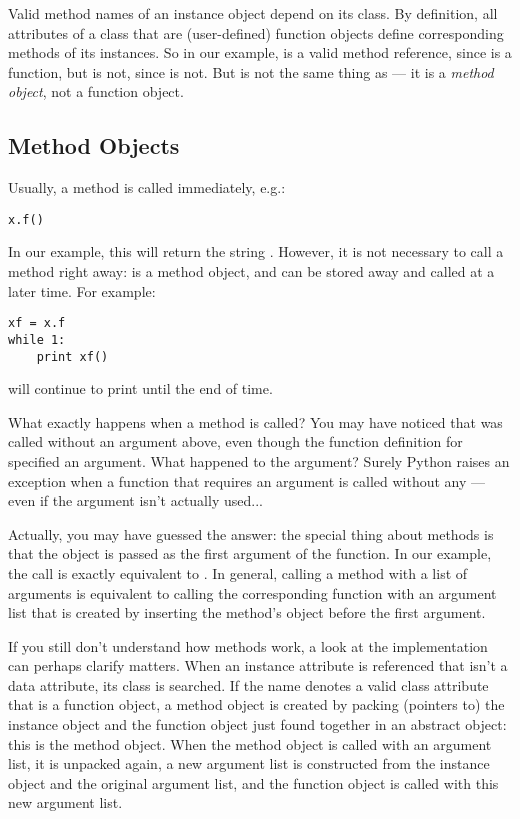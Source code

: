 \documentclass{manual}
\begin{document}
Valid method names of an instance object depend on its class.  By
definition, all attributes of a class that are (user-defined) function 
objects define corresponding methods of its instances.  So in our
example,  is a valid method reference, since
 is a function, but  is not, since
 is not.  But  is not the same thing as
 --- it is a \emph{method object}, not a function
object.%


\subsection{Method Objects \label{methodObjects}}

Usually, a method is called immediately, e.g.:

\begin{verbatim}
x.f()
\end{verbatim}

In our example, this will return the string .
However, it is not necessary to call a method right away:
 is a method object, and can be stored away and called at a
later time.  For example:

\begin{verbatim}
xf = x.f
while 1:
    print xf()
\end{verbatim}

will continue to print  until the end of time.

What exactly happens when a method is called?  You may have noticed
that  was called without an argument above, even though
the function definition for  specified an argument.  What
happened to the argument?  Surely Python raises an exception when a
function that requires an argument is called without any --- even if
the argument isn't actually used...

Actually, you may have guessed the answer: the special thing about
methods is that the object is passed as the first argument of the
function.  In our example, the call  is exactly equivalent
to .  In general, calling a method with a list of
 arguments is equivalent to calling the corresponding function
with an argument list that is created by inserting the method's object
before the first argument.

If you still don't understand how methods work, a look at the
implementation can perhaps clarify matters.  When an instance
attribute is referenced that isn't a data attribute, its class is
searched.  If the name denotes a valid class attribute that is a
function object, a method object is created by packing (pointers to)
the instance object and the function object just found together in an
abstract object: this is the method object.  When the method object is
called with an argument list, it is unpacked again, a new argument
list is constructed from the instance object and the original argument
list, and the function object is called with this new argument list.
\end{document}
